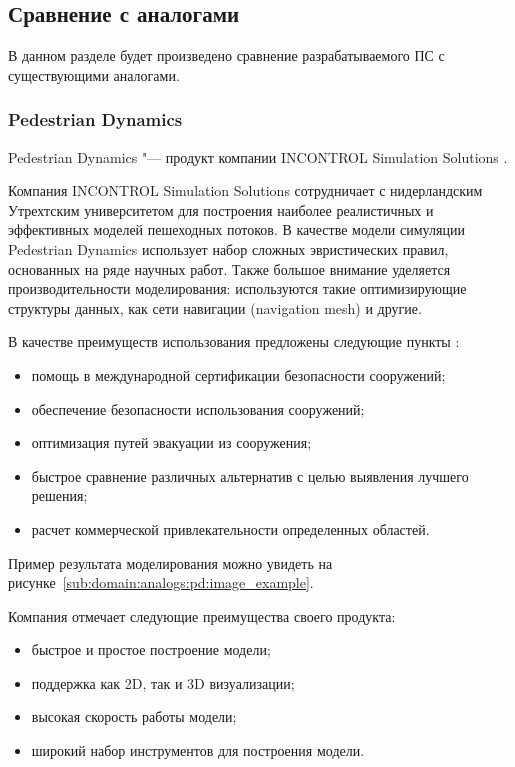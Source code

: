 \subsection{Сравнение с аналогами}
\label{sub:domain:analogs}

В данном разделе будет произведено сравнение разрабатываемого ПС с существующими аналогами.

\subsubsection{Pedestrian Dynamics}
\label{sub:domain:analogs:pd}

\newcommand{\iss}{ IN\-CON\-TROL Si\-mu\-la\-ti\-on So\-lu\-ti\-ons }

Pedestrian Dynamics "--- продукт компании \iss.

Компания \iss сотрудничает с нидерландским Утрехтским университетом для построения наиболее реалистичных и эффективных моделей пешеходных потоков.
В качестве модели симуляции Pedestrian Dynamics использует набор сложных эвристических правил, основанных на ряде научных работ.
Также большое внимание уделяется производительности моделирования: используются такие оптимизирующие структуры данных, как сети навигации (navigation mesh) и другие.

В качестве преимуществ использования предложены следующие пункты \cite{pedestrian_dynamics}:
\begin{itemize}
  \item помощь в международной сертификации безопасности сооружений;
  \item обеспечение безопасности использования сооружений;
  \item оптимизация путей эвакуации из сооружения;
  \item быстрое сравнение различных альтернатив с целью выявления лучшего решения;
  \item расчет коммерческой привлекательности определенных областей.
\end{itemize}

Пример результата моделирования можно увидеть на рисунке~\ref{sub:domain:analogs:pd:image_example}.

Компания отмечает следующие преимущества своего продукта:
\begin{itemize}
  \item быстрое и простое построение модели;
  \item поддержка как 2D, так и 3D визуализации;
  \item высокая скорость работы модели;
  \item широкий набор инструментов для построения модели.
\end{itemize}

